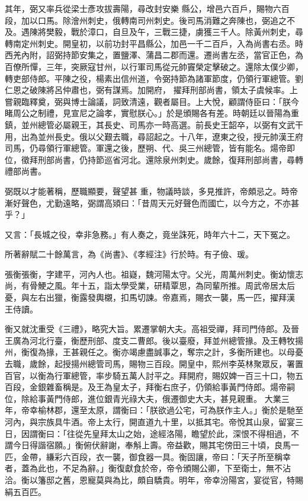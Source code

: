 \begin{pinyinscope}
 其年，弼又率兵從梁士彥攻拔壽陽，尋改封安樂
 縣公，增邑六百戶，賜物六百段，加以口馬。除澮州刺史，俄轉南司州刺史。後司馬消難之奔陳也，弼追之不及。遇陳將樊毅，戰於漳口，自旦及午，三戰三捷，虜獲三千人。除黃州刺史，尋轉南定州刺史。開皇初，以前功封平昌縣公，加邑一千二百戶，入為尚書右丞。時西羌內附，詔弼持節安集之，置鹽澤、蒲昌二郡而還。遷尚書左丞，當官正色，為百僚所憚，三年，突厥寇甘州，以行軍司馬從元帥竇榮定擊破之。還除太僕少卿，轉吏部侍郎。平陳之役，楊素出信州道，令弼持節為諸軍節度，仍領行軍總管。劉仁恩之破陳將呂仲肅也，弼有謀焉。加開府，
 擢拜刑部尚書，領太子虞候率。上嘗親臨釋奠，弼與博士論議，詞致清遠，觀者屬目。上大悅，顧謂侍臣曰：「朕今睹周公之制禮，見宣尼之論孝，實慰朕心。」於是頒賜各有差。時朝廷以晉陽為重鎮，並州總管必屬親王，其長史、司馬亦一時高選。前長史王韶卒，以弼有文武干用，出為並州長史。俄以父艱去職，尋詔起之。十八年，遼東之役，授元帥漢王府司馬，仍尋領行軍總管。軍還之後，歷朔、代、吳三州總管，皆有能名。煬帝即位，徵拜刑部尚書，仍持節巡省河北。還除泉州刺史。歲餘，復拜刑部尚書，尋轉禮部尚書。



 弼既以才能著稱，歷職顯要，聲望甚
 重，物議時談，多見推許，帝頗忌之。時帝漸好聲色，尤勤遠略，弼謂高熲曰：「昔周天元好聲色而國亡，以今方之，不亦甚乎？」



 又言：「長城之役，幸非急務。」有人奏之，竟坐誅死，時年六十二，天下冤之。



 所著辭賦二十餘萬言，為《尚書》、《孝經注》行於時。有子儉、瑗。



 張衡張衡，字建平，河內人也。祖嶷，魏河陽太守。父光，周萬州刺史。衡幼懷志尚，有骨鯁之風。年十五，詣太學受業，研精覃思，為同輩所推。周武帝居太后憂，與左右出獵，衡露發輿櫬，扣馬切諫。帝嘉焉，賜衣一襲，馬一匹，擢拜漢
 王侍讀。



 衡又就沈重受《三禮》，略究大旨。累遷掌朝大夫。高祖受禪，拜司門侍郎。及晉王廣為河北行臺，衡歷刑部、度支二曹郎。後以臺廢，拜並州總管掾。及王轉牧揚州，衡復為掾，王甚親任之。衡亦竭慮盡誠事之，奪宗之計，多衡所建也。以母憂去職，歲餘，起授揚州總管司馬，賜物三百段。開皇中，熙州李英林聚眾反，署置百官，以衡為行軍總管，率步騎五萬人討平之。拜開府，賜奴婢一百三十口，物五百段，金銀雜畜稱是。及王為皇太子，拜衡右庶子，仍領給事黃門侍郎。煬帝嗣位，除給事黃門侍郎，進位銀青光祿大夫，俄遷御史大夫，甚見親重。
 大業三年，帝幸榆林郡，還至太原，謂衡曰：「朕欲過公宅，可為朕作主人。」衡於是馳至河內，與宗族具牛酒。帝上太行，開直道九十里，以抵其宅。帝悅其山泉，留宴三日，因謂衡曰：「往從先皇拜太山之始，途經洛陽，瞻望於此，深恨不得相過，不謂今日得諧宿願。」衡俯伏辭謝，奉斛上壽。帝益歡，賜其宅傍田三十頃，良馬一匹，金帶，縑彩六百段，衣一襲，御食器一具。衡固讓，帝曰：「天子所至稱幸者，蓋為此也，不足為辭。」衡復獻食於帝，帝令頒賜公卿，下至衛士，無不沾洽。衡以籓邸之舊，恩寵莫與為比，頗自驕貴。明年，帝幸汾陽宮，宴從官，特賜絹五百匹。




\end{pinyinscope}

